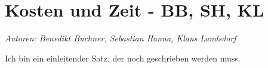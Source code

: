 \chapter{Kosten und Zeit - BB, SH, KL}

\textit{Autoren: Benedikt Buchner, Sebastian Hanna, Klaus Landsdorf}

Ich bin ein einleitender Satz, der noch geschrieben werden muss.



